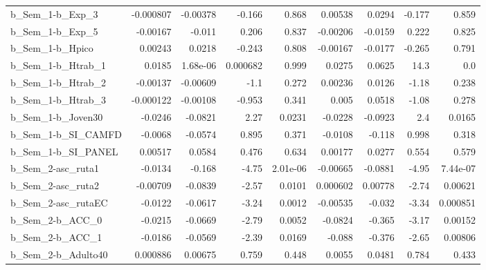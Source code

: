 \begin{tabular}{lrrrrrrrr}
b\_Sem\_1-b\_Exp\_3            &   -0.000807 &     -0.00378 &    -0.166 &    0.868 &    0.00538 &      0.0294 &       -0.177 &         0.859 \\
b\_Sem\_1-b\_Exp\_5            &    -0.00167 &       -0.011 &     0.206 &    0.837 &   -0.00206 &     -0.0159 &        0.222 &         0.825 \\
b\_Sem\_1-b\_Hpico            &     0.00243 &       0.0218 &    -0.243 &    0.808 &   -0.00167 &     -0.0177 &       -0.265 &         0.791 \\
b\_Sem\_1-b\_Htrab\_1          &      0.0185 &     1.68e-06 &  0.000682 &    0.999 &     0.0275 &      0.0625 &         14.3 &           0.0 \\
b\_Sem\_1-b\_Htrab\_2          &    -0.00137 &     -0.00609 &      -1.1 &    0.272 &    0.00236 &      0.0126 &        -1.18 &         0.238 \\
b\_Sem\_1-b\_Htrab\_3          &   -0.000122 &     -0.00108 &    -0.953 &    0.341 &      0.005 &      0.0518 &        -1.08 &         0.278 \\
b\_Sem\_1-b\_Joven30          &     -0.0246 &      -0.0821 &      2.27 &   0.0231 &    -0.0228 &     -0.0923 &          2.4 &        0.0165 \\
b\_Sem\_1-b\_SI\_CAMFD         &     -0.0068 &      -0.0574 &     0.895 &    0.371 &    -0.0108 &      -0.118 &        0.998 &         0.318 \\
b\_Sem\_1-b\_SI\_PANEL         &     0.00517 &       0.0584 &     0.476 &    0.634 &    0.00177 &      0.0277 &        0.554 &         0.579 \\
b\_Sem\_2-asc\_ruta1          &     -0.0134 &       -0.168 &     -4.75 & 2.01e-06 &   -0.00665 &     -0.0881 &        -4.95 &      7.44e-07 \\
b\_Sem\_2-asc\_ruta2          &    -0.00709 &      -0.0839 &     -2.57 &   0.0101 &   0.000602 &     0.00778 &        -2.74 &       0.00621 \\
b\_Sem\_2-asc\_rutaEC         &     -0.0122 &      -0.0617 &     -3.24 &   0.0012 &   -0.00535 &      -0.032 &        -3.34 &      0.000851 \\
b\_Sem\_2-b\_ACC\_0            &     -0.0215 &      -0.0669 &     -2.79 &   0.0052 &    -0.0824 &      -0.365 &        -3.17 &       0.00152 \\
b\_Sem\_2-b\_ACC\_1            &     -0.0186 &      -0.0569 &     -2.39 &   0.0169 &     -0.088 &      -0.376 &        -2.65 &       0.00806 \\
b\_Sem\_2-b\_Adulto40         &    0.000886 &      0.00675 &     0.759 &    0.448 &     0.0055 &      0.0481 &        0.784 &         0.433 \\

\end{tabular}
